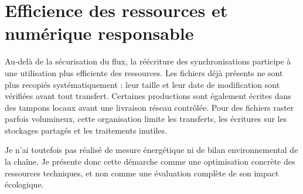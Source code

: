 \section{Efficience des ressources et numérique responsable}

Au-delà de la sécurisation du flux, la réécriture des synchronisations participe à une utilisation plus efficiente des ressources. Les fichiers déjà présents ne sont plus recopiés systématiquement : leur taille et leur date de modification sont vérifiées avant tout transfert. Certaines productions sont également écrites dans des tampons locaux avant une livraison réseau contrôlée. Pour des fichiers raster parfois volumineux, cette organisation limite les transferts, les écritures sur les stockages partagés et les traitements inutiles.

Je n'ai toutefois pas réalisé de mesure énergétique ni de bilan environnemental de la chaîne. Je présente donc cette démarche comme une optimisation concrète des ressources techniques, et non comme une évaluation complète de son impact écologique.
